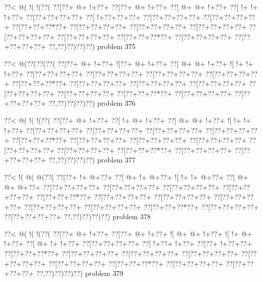 \vbox{\vbox{\goo
\0??<\- @(\- !(\- !(\0??(
\0??[\0??+\- @+\- !+\0??+
\0??[\0??+\- @+\- !+\0??+
\0??[\- @+\- @+\- !+\0??+
\0??[\- !+\- !+\- !+\0??+
\0??[\0??+\0??+\0??+\0??+
\0??[\- !+\0??+\0??+\0??+
\0??[\0??+\0??+\0??+\0??+
\0??[\0??+\0??+\0??+\0??+
\0??[\0??+\0??+\0??*\0??+
\0??[\0??+\0??+\0??+\0??+
\0??[\0??+\0??+\0??+\0??+
\0??[\0??+\0??+\0??+\0??+
\0??[\0??+\0??+\0??+\0??+
\0??[\0??+\0??+\0??+\0??+
\0??[\0??+\0??+\0??*\0??+
\0??[\0??+\0??+\0??+\0??+
\0??[\0??+\0??+\0??+\0??+
\0??,\0??)\0??)\0??)\0??)
}
\hfil problem 375\hfil\break
}

\vbox{\vbox{\goo
\0??<\- @(\0??(\0??(\0??(
\0??[\0??+\- @+\- !+\0??+
\- ![\0??+\- @+\- !+\0??+
\0??[\- @+\- @+\- !+\0??+
\- ![\- !+\- !+\- !+\0??+
\0??[\0??+\0??+\0??+\0??+
\0??[\0??+\0??+\0??+\0??+
\0??[\0??+\0??+\0??+\0??+
\0??[\0??+\0??+\0??+\0??+
\0??[\0??+\0??+\0??*\0??+
\0??[\0??+\0??+\0??+\0??+
\0??[\0??+\0??+\0??+\0??+
\0??[\0??+\0??+\0??+\0??+
\0??[\0??+\0??+\0??+\0??+
\0??[\0??+\0??+\0??+\0??+
\0??[\0??+\0??+\0??*\0??+
\0??[\0??+\0??+\0??+\0??+
\0??[\0??+\0??+\0??+\0??+
\0??,\0??)\0??)\0??)\0??)
}
\hfil problem 376\hfil\break
}

\vbox{\vbox{\goo
\0??<\- @(\- !(\- !(\0??(
\0??[\0??+\- @+\- !+\0??+
\0??[\- !+\- @+\- !+\0??+
\0??[\- @+\- @+\- !+\0??+
\- ![\- !+\- !+\- !+\0??+
\0??[\0??+\0??+\0??+\0??+
\0??[\0??+\0??+\0??+\0??+
\0??[\0??+\0??+\0??+\0??+
\0??[\0??+\0??+\0??+\0??+
\0??[\0??+\0??+\0??*\0??+
\0??[\0??+\0??+\0??+\0??+
\0??[\0??+\0??+\0??+\0??+
\0??[\0??+\0??+\0??+\0??+
\0??[\0??+\0??+\0??+\0??+
\0??[\0??+\0??+\0??+\0??+
\0??[\0??+\0??+\0??*\0??+
\0??[\0??+\0??+\0??+\0??+
\0??[\0??+\0??+\0??+\0??+
\0??,\0??)\0??)\0??)\0??)
}
\hfil problem 377\hfil\break
}

\vbox{\vbox{\goo
\0??<\- !(\- @(\- @(\0??(
\0??[\0??+\- !+\- @+\0??+
\0??[\- @+\- !+\- @+\0??+
\- ![\- !+\- !+\- @+\0??+
\0??[\- @+\- @+\- @+\0??+
\0??[\0??+\0??+\0??+\0??+
\0??[\0??+\0??+\0??+\0??+
\0??[\0??+\0??+\0??+\0??+
\0??[\0??+\0??+\0??+\0??+
\0??[\0??+\0??+\0??*\0??+
\0??[\0??+\0??+\0??+\0??+
\0??[\0??+\0??+\0??+\0??+
\0??[\0??+\0??+\0??+\0??+
\0??[\0??+\0??+\0??+\0??+
\0??[\0??+\0??+\0??+\0??+
\0??[\0??+\0??+\0??*\0??+
\0??[\0??+\0??+\0??+\0??+
\0??[\0??+\0??+\0??+\0??+
\0??,\0??)\0??)\0??)\0??)
}
\hfil problem 378\hfil\break
}

\vbox{\vbox{\goo
\0??<\- @(\- !(\- !(\0??(
\0??[\0??+\- @+\- !+\0??+
\0??[\0??+\- @+\- !+\0??+
\- ![\- @+\- @+\- !+\0??+
\- ![\- !+\- @+\- !+\0??+
\0??[\- @+\- !+\- !+\0??+
\0??[\0??+\0??+\0??+\0??+
\0??[\- !+\0??+\- !+\0??+
\0??[\0??+\- !+\0??+\0??+
\0??[\0??+\0??+\0??*\0??+
\0??[\0??+\0??+\0??+\0??+
\0??[\0??+\0??+\0??+\0??+
\0??[\0??+\0??+\0??+\0??+
\0??[\0??+\0??+\0??+\0??+
\0??[\0??+\0??+\0??+\0??+
\0??[\0??+\0??+\0??*\0??+
\0??[\0??+\0??+\0??+\0??+
\0??[\0??+\0??+\0??+\0??+
\0??,\0??)\0??)\0??)\0??)
}
\hfil problem 379\hfil\break
}

